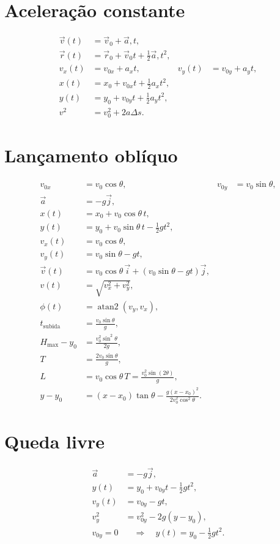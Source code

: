 \documentclass[12pt,a4paper]{article}
\newcommand{\vi}{\vec{i}}
\newcommand{\vj}{\vec{j}}
\begin{document}
\section*{Aceleração constante}
\begin{align*}
\vec v(t)&=\vec v_0+\vec a,t,\\
\vec r(t)&=\vec r_0+\vec v_0t+\frac12\vec a,t^2,\\
v_x(t)&=v_{0x}+a_xt, & v_y(t)&=v_{0y}+a_yt,\\
x(t)&=x_0+v_{0x}t+\frac12a_xt^2,\\
y(t)&=y_0+v_{0y}t+\frac12a_yt^2,\\
v^2&=v_0^2+2a\Delta s.
\end{align*}

\section*{Lançamento oblíquo}
\begin{align*}
v_{0x}&=v_0\cos\theta, & v_{0y}&=v_0\sin\theta,\\
\vec a&=-g\vj,\\
x(t)&=x_0+v_0\cos\theta\,t,\\
y(t)&=y_0+v_0\sin\theta\,t-\frac12gt^2,\\
v_x(t)&=v_0\cos\theta,\\
v_y(t)&=v_0\sin\theta-gt,\\
\vec v(t)&=v_0\cos\theta\,\vi+
\left(v_0\sin\theta-gt\right)\vj,\\
v(t)&=\sqrt{v_x^2+v_y^2},\\
\phi(t)&=\operatorname{atan2}(v_y,v_x),\\
t_{\mathrm{subida}}&=\frac{v_0\sin\theta}{g},\\
H_{\max}-y_0&=\frac{v_0^2\sin^2\theta}{2g},\\
T&=\frac{2v_0\sin\theta}{g},\\
L&=v_0\cos\theta\,T
=\frac{v_0^2\sin(2\theta)}{g},\\
y-y_0&=(x-x_0)\tan\theta
-\frac{g(x-x_0)^2}{2v_0^2\cos^2\theta}.
\end{align*}

\section*{Queda livre}
\begin{align*}
\vec a&=-g\vj,\\
y(t)&=y_0+v_{0y}t-\frac12gt^2,\\
v_y(t)&=v_{0y}-gt,\\
v_y^2&=v_{0y}^2-2g(y-y_0),\\
v_{0y}=0&\quad\Longrightarrow\quad y(t)=y_0-\frac12gt^2.
\end{align*}
\end{document}
